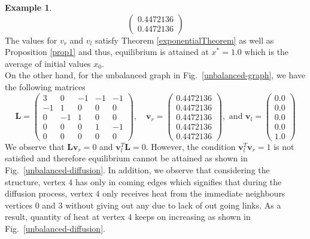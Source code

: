 \documentclass[10pt,a4paper]{article}
\theoremstyle{plain}
\theoremstyle{definition}
\newtheorem{exa}[subsection]{Example}
\begin{document}
\begin{exa}
\begin{equation*}
\begin{pmatrix}
   0.4472136 \\
   0.4472136
   \end{pmatrix}
   \end{equation*} 
   The values for $v_r$ and $v_l$ satisfy Theorem \ref{exponentialTheorem} as well as Proposition \ref{prop1} and thus, equilibrium is attained at $x^*=1.0$ which is the average of initial values $x_0$.\\
   On the other hand, for the unbalanced graph in Fig.~\ref{unbalanced-graph}, we have the following matrices
    \begin{equation*}
   \mathbf{L} = \begin{pmatrix}
    3 &  0 & -1 & -1 & -1 \\
   -1 &  1 & 0  & 0  & 0  \\
    0 & -1 & 1  & 0  & 0  \\
    0 &  0 & 0  & 1  & -1 \\
    0 &  0 & 0  & 0  & 0
   \end{pmatrix}, \quad 
   \mathbf{v}_r = \begin{pmatrix}
   0.4472136 \\  
   0.4472136 \\  
   0.4472136 \\ 
   0.4472136 \\
   0.4472136
   \end{pmatrix}, \text{ and }
   \mathbf{v}_l = \begin{pmatrix}
   0.0 \\  
   0.0 \\  
   0.0 \\ 
   0.0 \\
   1.0
   \end{pmatrix}
   \end{equation*}
   We observe that $\mathbf{L} \mathbf{v}_r = 0$ and $\mathbf{v}_l^T \mathbf{L} = 0$. However, the condition $\mathbf{v}_l^T \mathbf{v}_r = 1$  is not satisfied and therefore equilibrium cannot be attained as shown in Fig.~\ref{unbalanced-diffusion}. In addition, we observe that considering the structure, vertex $4$ has only in coming edges which signifies that during the diffusion process, vertex $4$ only receives heat from the immediate neighbours vertices $0$ and $3$ without giving out any due to lack of out going links. As a result, quantity of heat at vertex $4$ keeps on increasing as shown in Fig.~\ref{unbalanced-diffusion}.
   \end{exa}
	
\end{document}
